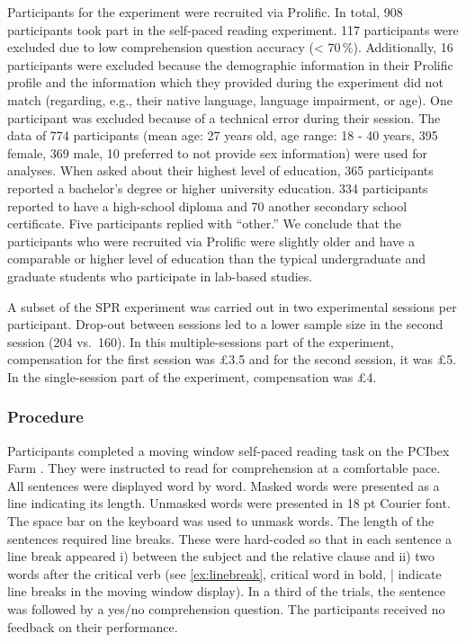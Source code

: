 \documentclass[a4paper, man, floatsintext]{apa7}
\begin{document}





Participants for the experiment were recruited via Prolific. In total, 908 participants took part in the self-paced reading experiment. 117 participants were excluded due to low comprehension question accuracy (< 70\,\%). Additionally, 16 participants were excluded because the demographic information in their Prolific profile and the information which they provided during the experiment did not match (regarding, e.g., their native language, language impairment, or age). One participant was excluded because of a technical error during their session. The data of 774 participants (mean age: 27 years old, age range: 18 - 40 years, 395 female, 369 male, 10 preferred to not provide sex information) were used for analyses. When asked about their highest level of education, 365 participants reported a bachelor's degree or higher university education. 334 participants reported to have a high-school diploma and 70 another secondary school certificate. Five participants replied with ``other.'' We conclude that the participants who were recruited via Prolific were slightly older and have a comparable or higher level of education than the typical undergraduate and graduate students who participate in lab-based studies.

A subset of the SPR experiment was carried out in two experimental sessions per participant. Drop-out between sessions led to a lower sample size in the second session (204 vs.\ 160). In this multiple-sessions part of the experiment, compensation for the first session was \pounds 3.5 and for the second session, it was \pounds 5. In the single-session part of the experiment, compensation was \pounds 4. 

\subsubsection{Procedure}
Participants completed a moving window self-paced reading task \citep{just_etal_1982} on the PCIbex Farm \citep{pcibex}. They were instructed to read for comprehension at a comfortable pace. All sentences were displayed word by word. Masked words were presented as a line indicating its length. Unmasked words were presented in 18 pt Courier font. The space bar on the keyboard was used to unmask words. The length of the sentences required line breaks. These were hard-coded so that in each sentence a line break appeared i) between the subject and the relative clause and ii) two words after the critical verb (see \ref{ex:linebreak}, critical word in bold, | indicate line breaks in the moving window display). In a third of the trials, the sentence was followed by a yes/no comprehension question. The participants received no feedback on their performance.
\end{document}
